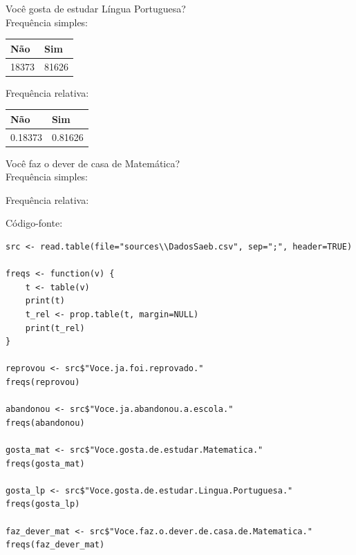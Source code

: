 \documentclass[17pt]{extarticle}
\begin{document}
\noindent
Você gosta de estudar Língua Portuguesa? \\
Frequência simples:
\begin{table}[H]
\begin{tabular}{|l|l|}
\hline
Não   & Sim \\ \hline
18373 & 81626        \\ \hline
\end{tabular}
\end{table}
\noindent
Frequência relativa:
\begin{table}[H]
    \begin{tabular}{|l|l|}
    \hline
    Não   & Sim \\ \hline
    0.18373 & 0.81626        \\ \hline
    \end{tabular}
\end{table}

\noindent
Você faz o dever de casa de Matemática? \\
Frequência simples:
\begin{table}[H]
\end{table}
\noindent
Frequência relativa:
\begin{table}[H]
\end{table}

Código-fonte:
\begin{lstlisting}
src <- read.table(file="sources\\DadosSaeb.csv", sep=";", header=TRUE)

freqs <- function(v) {
    t <- table(v)
    print(t)
    t_rel <- prop.table(t, margin=NULL)
    print(t_rel)
}

reprovou <- src$"Voce.ja.foi.reprovado."
freqs(reprovou)

abandonou <- src$"Voce.ja.abandonou.a.escola."
freqs(abandonou)

gosta_mat <- src$"Voce.gosta.de.estudar.Matematica."
freqs(gosta_mat)

gosta_lp <- src$"Voce.gosta.de.estudar.Lingua.Portuguesa."
freqs(gosta_lp)

faz_dever_mat <- src$"Voce.faz.o.dever.de.casa.de.Matematica."
freqs(faz_dever_mat)

\end{lstlisting}
\end{document}
